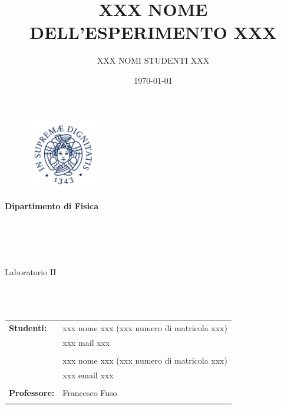 \documentclass[a4paper,11pt]{article}
\title{XXX NOME DELL'ESPERIMENTO XXX} %
\author{XXX NOMI STUDENTI XXX}
\date{\today}
\begin{document}
	\begin{titlepage}
		\thispagestyle{empty}
		\begin{figure}
			\includegraphics[width=31.5mm,right]{./Cherubino}
		\end{figure}
		\vspace*{-43mm}\hspace{-6mm}\textbf{\textcolor{pantone294}{\large{Dipartimento di Fisica}}}\\\\\\\\\\
		
		\vspace{30mm}
		\begin{center}
			\textcolor{pantone294}{\huge{Laboratorio II}}\\\vspace*{7mm}
			\textcolor{pantone294}{\huge{\textbf{\thetitle}}}\\\vspace*{10mm}
			\textcolor{pantone294}{\theauthor}\\\vspace*{10mm}
			\textcolor{pantone294}{\thedate}\\\vspace*{20mm}
			\begin{tabular}{ll}
				\textbf{Studenti:} & xxx nome xxx (xxx numero di matricola xxx) \\
				& xxx mail xxx\\ \\
				& xxx nome xxx (xxx numero di matricola xxx) \\
				& xxx email xxx \\ \\
				\textbf{Professore:} & Francesco Fuso \\ \\
				
			\end{tabular}
		\end{center}
	\end{titlepage}
	\makeatother
	\restoregeometry
	\newpage
	
\end{document}
